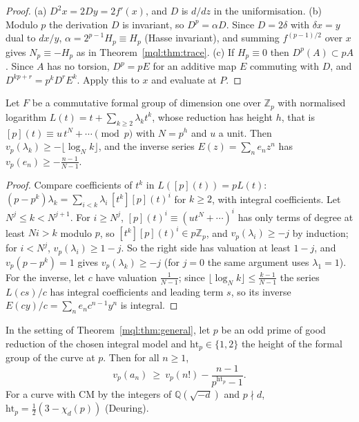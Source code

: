 \begin{proof}
(a) $D^2x=2Dy=2f'(x)$, and $D$ is $d/dz$ in the uniformisation. (b) Modulo $p$ the derivation $D$ is invariant, so $D^p=\alpha D$. Since $D=2\delta$ with $\delta x=y$ dual to $dx/y$, $\alpha=2^{p-1}H_p\equiv H_p$ (Hasse invariant), and summing $f^{(p-1)/2}$ over $x$ gives $N_p\equiv-H_p$ as in Theorem~\ref{mql:thm:trace}. (c) If $H_p\equiv0$ then $D^p(A)\subset pA$. Since $A$ has no torsion, $D^p=pE$ for an additive map $E$ commuting with $D$, and $D^{kp+r}=p^kD^rE^k$. Apply this to $x$ and evaluate at $P$.
\end{proof}

\begin{lemma}\label{mql:lem:log}
Let $F$ be a commutative formal group of dimension one over $\mathbb Z_p$ with normalised logarithm $L(t)=t+\sum_{k\ge2}\lambda_kt^k$, whose reduction has height $h$, that is $[p](t)\equiv u\,t^{N}+\cdots\pmod p$ with $N=p^h$ and $u$ a unit. Then $v_p(\lambda_k)\ge-\lfloor\log_Nk\rfloor$, and the inverse series $E(z)=\sum_ne_nz^n$ has $v_p(e_n)\ge-\frac{n-1}{N-1}$.
\end{lemma}

\begin{proof}
Compare coefficients of $t^k$ in $L([p](t))=pL(t)$: $(p-p^k)\lambda_k=\sum_{i<k}\lambda_i\,[t^k][p](t)^i$ for $k\ge2$, with integral coefficients. Let $N^j\le k<N^{j+1}$. For $i\ge N^j$, $[p](t)^i\equiv(ut^N+\cdots)^i$ has only terms of degree at least $Ni>k$ modulo $p$, so $[t^k][p](t)^i\in p\mathbb Z_p$, and $v_p(\lambda_i)\ge-j$ by induction; for $i<N^j$, $v_p(\lambda_i)\ge1-j$. So the right side has valuation at least $1-j$, and $v_p(p-p^k)=1$ gives $v_p(\lambda_k)\ge-j$ (for $j=0$ the same argument uses $\lambda_1=1$). For the inverse, let $c$ have valuation $\frac1{N-1}$; since $\lfloor\log_Nk\rfloor\le\frac{k-1}{N-1}$ the series $L(cs)/c$ has integral coefficients and leading term $s$, so its inverse $E(cy)/c=\sum_ne_nc^{n-1}y^n$ is integral.
\end{proof}

\begin{theorem}\label{mql:thm:height}
In the setting of Theorem~\ref{mql:thm:general}, let $p$ be an odd prime of good reduction of the chosen integral model and $\mathrm{ht}_p\in\{1,2\}$ the height of the formal group of the curve at $p$. Then for all $n\ge1$,
\[
v_p(a_n)\ \ge\ v_p(n!)-\frac{n-1}{p^{\mathrm{ht}_p}-1}.
\]
For a curve with CM by the integers of $\mathbb Q(\sqrt{-d})$ and $p\nmid d$, $\mathrm{ht}_p=\frac12(3-\chi_{d}(p))$ (Deuring).
\end{theorem}

